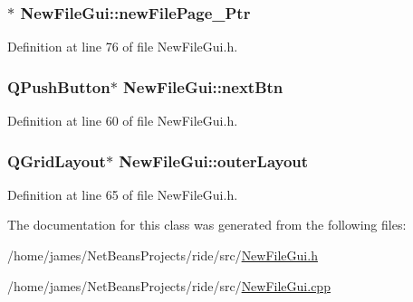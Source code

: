 \hypertarget{class_new_file_gui_a5b83d6fcae79fb5da3677848ec49647f}{
\subsubsection[{new\-File\-Page\-\_\-4\-Ptr}]{$\ast$ New\-File\-Gui\-::new\-File\-Page\-\_\-Ptr\hspace{0.3cm}{\ttfamily [private]}}}\label{class_new_file_gui_a5b83d6fcae79fb5da3677848ec49647f}


Definition at line 76 of file New\-File\-Gui.\-h.

\hypertarget{class_new_file_gui_ad1fa3cb3fa909bf6e71672497350f980}{
\subsubsection[{next\-Btn}]{\setlength{\rightskip}{0pt plus 5cm}Q\-Push\-Button$\ast$ New\-File\-Gui\-::next\-Btn\hspace{0.3cm}{\ttfamily [private]}}}\label{class_new_file_gui_ad1fa3cb3fa909bf6e71672497350f980}


Definition at line 60 of file New\-File\-Gui.\-h.

\hypertarget{class_new_file_gui_ae5aa1370799c06f4368ef636279ab259}{
\subsubsection[{outer\-Layout}]{\setlength{\rightskip}{0pt plus 5cm}Q\-Grid\-Layout$\ast$ New\-File\-Gui\-::outer\-Layout\hspace{0.3cm}{\ttfamily [private]}}}\label{class_new_file_gui_ae5aa1370799c06f4368ef636279ab259}


Definition at line 65 of file New\-File\-Gui.\-h.



The documentation for this class was generated from the following files\-:\begin{DoxyCompactItemize}
\item 
/home/james/\-Net\-Beans\-Projects/ride/src/\hyperlink{_new_file_gui_8h}{New\-File\-Gui.\-h}\item 
/home/james/\-Net\-Beans\-Projects/ride/src/\hyperlink{_new_file_gui_8cpp}{New\-File\-Gui.\-cpp}\end{DoxyCompactItemize}
